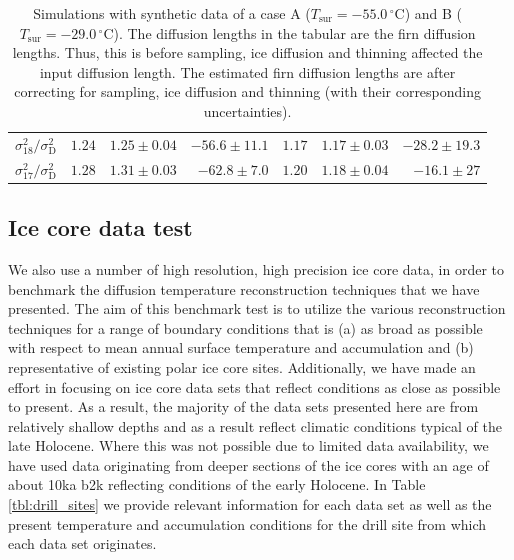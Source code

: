 \documentclass[11pt, draftcls, onecolumn]{IEEEtran} %
\numberwithin{equation}{section}
\numberwithin{table}{section}
\numberwithin{figure}{section}
\begin{document}
\begin{table}[]
\begin{tabular}{r r r r r r r }
	
		$\sigma^2_{18}/\sigma^2_\mathrm{D} $&$	1.24$& $1.25 \pm 0.04 $ 	& $-56.6 \pm 11.1$	&$1.17$	& 	$1.17 \pm 0.03$ 	& $-28.2 \pm 19.3$\\
	
	
		$\sigma^2_{17}/\sigma^2_\mathrm{D} $&$	1.28$& $ 1.31 \pm 0.03 $ 	& $  -62.8 \pm 7.0$	&$1.20$	& 	$1.18 \pm 0.04$ 	& $ -16.1 \pm 27 $\\
		\bottomrule		
	\end{tabular}
	\caption{Simulations with synthetic data of a case A ($T_{\mathrm{sur}} = -55.0 \,^{\circ} \mathrm{C}$) 
			and B ($T_{\mathrm{sur}} = -29.0 \,^{\circ} \mathrm{C}$). 
			The diffusion lengths in the tabular are the firn diffusion lengths.
			Thus, this is before sampling, ice diffusion and thinning affected the input diffusion length.
			The estimated firn diffusion lengths are after correcting for sampling, ice diffusion and thinning (with their corresponding uncertainties).  }
	\label{tbl:synthetic_diff_lens}
\end{table}

\subsection{Ice core data test} \label{sec:icecore_results}
We also use a number of high resolution, high precision ice core data, in order to benchmark the 
diffusion temperature reconstruction techniques that we have  presented.
The aim of this benchmark test is to utilize the various  reconstruction techniques for a range of
boundary conditions that is (a) as broad as possible with respect to mean annual surface temperature 
and accumulation and (b) representative of existing polar ice core sites.
Additionally, we have made an effort in focusing on ice core  data sets that reflect conditions as close as possible to 
present. As a result, the majority of the data sets presented here are from relatively shallow depths and as a result
reflect climatic conditions typical of the late Holocene. Where this was not possible due to limited data availability,
we have used data originating from deeper sections of the ice cores with an age  
of about 10ka b2k reflecting conditions of  the early Holocene. In Table \ref{tbl:drill_sites} we provide relevant 
information for each data set as well as the present 
temperature and accumulation conditions for the drill site from which each data set originates.
\end{document}

